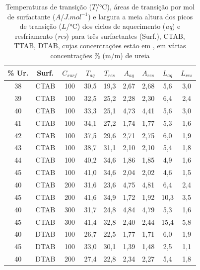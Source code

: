         \begin{table}[h]
            \IBGEtab%
            {\caption{Temperaturas de transição ($T$/°C), áreas de transição por mol de surfactante ($A$/$J.mol^{-1}$) e largura a meia altura dos picos de transição ($L$/°C) dos ciclos de aquecimento (\emph{aq}) e resfriamento (\emph{res}) para três surfactantes (Surf.), CTAB, TTAB, DTAB, cujas concentrações estão em \mM, em várias concentrações \% (m/m) de ureia}
            \label{tab:DSC_temp_areas}}%
            {\begin{tabular}{ccccccccc}
                \toprule
    			\% Ur. & Surf. & $C_{surf}$ &
    			$T_{aq}$ & $T_{res}$ & $A_{aq}$ & $A_{res}$ & $L_{aq}$ & $L_{res}$\\
    			\midrule
    			38 & CTAB & 100 & 30,5 & 19,3 & 2,67 & 2,68 & 5,6 &	3,0\\
    			39 & CTAB & 100 & 32,5 & 25,2 & 2,28 & 2,30 & 6,4 &	2,4\\
    			40 & CTAB & 100 & 33,3 & 25,1 & 4,73 & 4,41 & 5,6 &	3,0\\
    			41 & CTAB & 100 & 34,1 & 27,2 & 1,74 & 1,77 & 5,3 &	1,6\\
    			42 & CTAB & 100 & 37,5 & 29,6 & 2,71 & 2,75 & 6,0 &	1,9\\
    			43 & CTAB & 100 & 38,7 & 31,1 & 2,10 & 2,10 & 5,4 &	1,8\\
    			44 & CTAB & 100 & 40,2 & 34,6 & 1,86 & 1,85 & 4,9 &	1,6\\
    			45 & CTAB & 100 & 41,0 & 34,6 & 2,04 & 2,02 & 4,6 &	1,5\\
    			\midrule
    			40 & CTAB & 200 & 31,6 & 23,6 & 4,75 & 4,81 & 6,4 &	2,4\\
    			45 & CTAB & 200 & 41,6 & 34,9 & 1,72 & 1,92 & 10,3 & 3,5\\
    			40 & CTAB & 300 & 31,7 & 24,8 & 4,84 & 4,79 & 5,3 &	1,6\\
    			45 & CTAB & 300 & 41,4 & 32,8 & 2,40 & 2,44 & 15,4 & 5,8\\
    			\midrule
    			40 & DTAB & 100 & 26,7 & 22,5 & 1,77 & 1,71 & 6,0 & 1,9\\
    			45 & DTAB & 100 & 33,0 & 30,1 & 1,39 & 1,48 & 2,5 & 1,1\\
    			40 & DTAB & 200 & 27,4 & 22,8 & 2,34 & 2,27 & 5,4 &	1,8\\

\end{tabular}}
\end{table}
